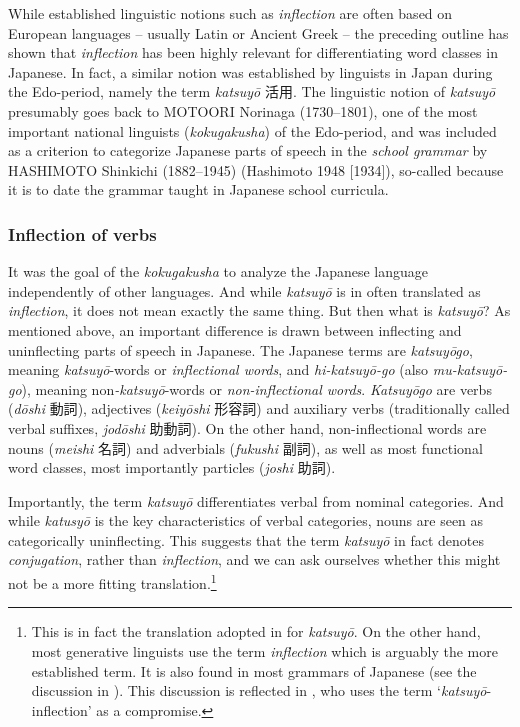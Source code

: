 \documentclass[output=paper,colorlinks,citecolor=brown]{langscibook}
\begin{document}
While established linguistic notions such as \emph{inflection} are often based on European languages -- usually Latin or Ancient Greek -- the preceding outline has shown that \emph{inflection} has been highly relevant for differentiating word classes in Japanese. In fact, a similar notion was established by linguists in Japan during the Edo-period, namely the term \emph{katsuyō} {\japanesefont 活用}. The linguistic notion of \emph{katsuyō} presumably goes back to MOTOORI Norinaga (1730--1801), one of the most important national linguists (\emph{kokugakusha}) of the Edo-period, and was included as a criterion to categorize Japanese parts of speech in the \emph{school grammar} by HASHIMOTO Shinkichi (1882--1945) (Hashimoto 1948 [1934]), so-called because it is to date the grammar taught in Japanese school curricula.

\subsubsection{Inflection of verbs} \label{12sec3.2.1}

It was the goal of the \emph{kokugakusha} to analyze the Japanese language independently of other languages. And while \emph{katsuyō} is in  often translated as \emph{inflection}, it does not mean exactly the same thing. But then what is \emph{katsuyō}? As mentioned above, an important difference is drawn between inflecting and uninflecting parts of speech in Japanese. The Japanese terms are \emph{katsuyōgo}, meaning \emph{katsuyō}-words or \emph{inflectional words}, and \emph{hi-katsuyō-go} (also \emph{mu-katsuyō-go}), meaning non\emph{-katsuyō}-words or \emph{non-inflectional words}. \emph{Katsuyōgo} are verbs (\emph{dōshi} {\japanesefont 動詞}), adjectives
(\emph{keiyōshi} {\japanesefont 形容詞}) and auxiliary verbs (traditionally called verbal suffixes, \emph{jodōshi} {\japanesefont 助動詞}). On the other hand, non-inflectional words are nouns (\emph{meishi} {\japanesefont 名詞}) and adverbials (\emph{fukushi} {\japanesefont 副詞}), as well as most functional word classes, most importantly particles (\emph{joshi} {\japanesefont 助詞}).

Importantly, the term \emph{katsuyō} differentiates verbal from nominal categories. And while \emph{katusyō} is the key characteristics of verbal categories, nouns are seen as categorically uninflecting. This suggests that the term \emph{katsuyō} in fact denotes \emph{conjugation}, rather than \emph{inflection}, and we can ask ourselves whether this might not be a more fitting translation.\footnote{This is in fact the translation adopted in \citet{martin1975} for \emph{katsuyō}. On the other hand, most generative linguists use the term \emph{inflection} which is arguably the more established term. It is also found in most grammars of Japanese (see the discussion in \citealt[58--59]{uehara1998}). This discussion is reflected in \citet{uehara1998}, who uses the term `\emph{katsuyō}-inflection' as a compromise.}
\end{document}
